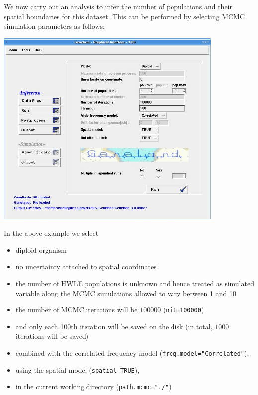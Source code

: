 \documentclass[a4paper,10pt]{article}
\begin{document}
We now carry out an analysis to infer the number of populations and their spatial boundaries for this dataset.
This can be performed by selecting MCMC simulation parameters as follows:\\

\centerline{\includegraphics[width=11cm]{./fig/MCMC.jpg}}

\bigskip

In the above example we select

\begin{itemize}
\item diploid organism
\item no uncertainty attached to spatial coordinates
\item the number of HWLE populations is unknown and hence treated as simulated 
variable along the MCMC simulations allowed to vary between 1 and 10
\item the number of MCMC iterations will be $100000$ (\texttt{nit=100000}) 
\item and only each 100th iteration will be saved on the disk (in total, $1000$ iterations will be saved)
\item combined with 
the correlated frequency model (\texttt{freq.model="Correlated"}). 

\item using the spatial model (\texttt{spatial TRUE}), 


\item in the current working directory (\texttt{path.mcmc="./"}).
\end{itemize}
\end{document}
